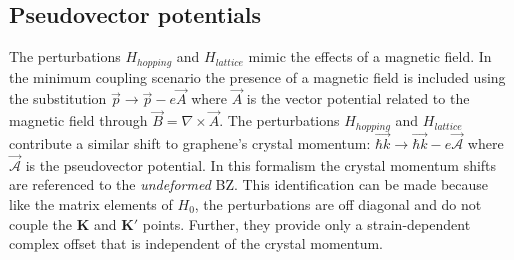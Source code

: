 \subsection{Pseudovector potentials}
The perturbations $H_{hopping}$ and $H_{lattice}$ mimic the effects of a magnetic field.
In the minimum coupling scenario the presence of a magnetic field is included using the substitution $\vec{p} \rightarrow \vec{p} - e \vec{A}$ where $\vec{A}$ is the vector potential related to the magnetic field through $\vec{B}=\nabla \times \vec{A}$.
The perturbations $H_{hopping}$ and $H_{lattice}$ contribute a similar shift to graphene's crystal momentum: $\vec{\hbar k} \rightarrow \vec{\hbar k} - e \vec{\mathcal{A}}$ where $\vec{\mathcal{A}}$ is the pseudovector potential.
In this formalism the crystal momentum shifts are referenced to the \emph{undeformed} BZ.
This identification can be made because like the matrix elements of $H_0$, the perturbations are off diagonal and do not couple the $\bm{K}$ and $\bm{K'}$ points.
Further, they provide only a strain-dependent complex offset that is independent of the crystal momentum.

